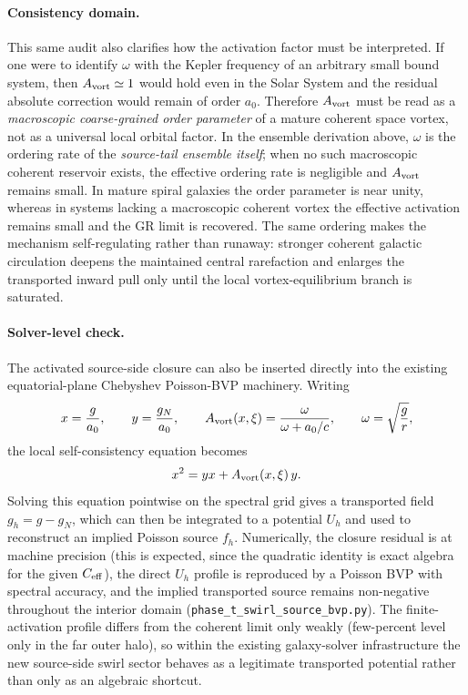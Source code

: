 \documentclass[11pt]{article}
\begin{document}
\paragraph{Consistency domain.}\label{sec:consistency_domain}
This same audit also clarifies how the activation factor must be interpreted.
If one were to identify $\omega$ with the Kepler frequency of an arbitrary
small bound system, then $A_{\rm vort}\simeq1$ would hold even in the Solar
System and the residual absolute correction would remain of order $a_0$.
Therefore $A_{\rm vort}$ must be read as a \emph{macroscopic coarse-grained
order parameter} of a mature coherent space vortex, not as a universal local
orbital factor.  In the ensemble derivation above, $\omega$ is the ordering
rate of the \emph{source-tail ensemble itself}; when no such macroscopic
coherent reservoir exists, the effective ordering rate is negligible and
$A_{\rm vort}$ remains small.  In mature spiral galaxies the order parameter
is near unity, whereas in systems lacking a macroscopic coherent vortex the
effective activation remains small and the GR limit is recovered.
The same ordering makes the mechanism self-regulating rather than
runaway: stronger coherent galactic circulation deepens the maintained
central rarefaction and enlarges the transported inward pull only until
the local vortex-equilibrium branch is saturated.

\paragraph{Solver-level check.}
The activated source-side closure can also be inserted directly into the
existing equatorial-plane Chebyshev Poisson-BVP machinery.  Writing
\[
x=\frac{g}{a_0},\qquad y=\frac{g_N}{a_0},
\qquad
A_{\rm vort}(x,\xi)=
\frac{\omega}{\omega+a_0/c},
\qquad
\omega=\sqrt{\frac{g}{r}},
\]
the local self-consistency equation becomes
\[
x^2 = yx + A_{\rm vort}(x,\xi)\,y.
\]
Solving this equation pointwise on the spectral grid gives a transported field
$g_h=g-g_N$, which can then be integrated to a potential $U_h$ and used to
reconstruct an implied Poisson source $f_h$.  Numerically, the closure
residual is at machine precision (this is expected, since the quadratic
identity is exact algebra for the given $C_{\rm eff}$), the direct $U_h$
profile is reproduced by a Poisson BVP with spectral accuracy, and the
implied transported source remains non-negative throughout the interior domain
(\texttt{phase\_t\_swirl\_source\_bvp.py}).  The finite-activation profile
differs from the coherent limit only weakly (few-percent level only in the far
outer halo), so within the existing galaxy-solver infrastructure the new
source-side swirl sector behaves as a legitimate transported potential rather
than only as an algebraic shortcut.
\end{document}
